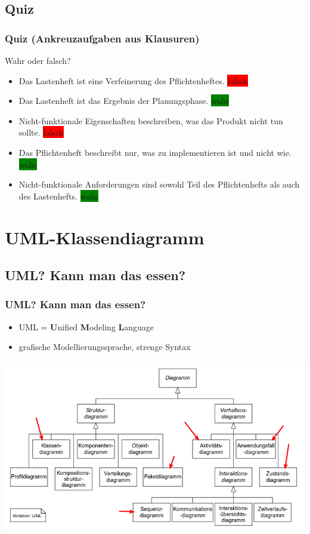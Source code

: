 \documentclass[18pt]{beamer}
\begin{document}
	\subsection{Quiz}
	\begin{frame}
		\frametitle{Quiz (Ankreuzaufgaben aus Klausuren)}
		Wahr oder falsch?
		\begin{itemize}
			\item Das Lastenheft ist eine Verfeinerung des Pflichtenheftes. \pause \colorbox{red}{falsch} \pause
			\item Das Lastenheft ist das Ergebnis der Planungsphase. \pause \colorbox{green}{wahr} \pause
			\item Nicht-funktionale Eigenschaften beschreiben, was das Produkt nicht tun sollte. \pause \colorbox{red}{falsch} \pause 
			\item Das Pflichtenheft beschreibt nur, was zu implementieren ist und nicht wie. \pause \colorbox{green}{wahr} \pause 
			\item Nicht-funktionale Anforderungen sind sowohl Teil des Pflichtenhefts als auch des Lastenhefts. \pause \colorbox{green}{wahr}
		\end{itemize}
		
	\end{frame}

\section{UML-Klassendiagramm}
	\subsection{UML? Kann man das essen?}
	\begin{frame}
		\frametitle{UML? Kann man das essen?}
		\begin{itemize}
			\item UML = \textbf{U}nified \textbf{M}odeling \textbf{L}anguage
			\item grafische Modellierungssprache, strenge Syntax
		\end{itemize}
		\includegraphics[scale=0.35]{./pics/tut1/uml_diagrams.png}
	\end{frame}	
\end{document}
